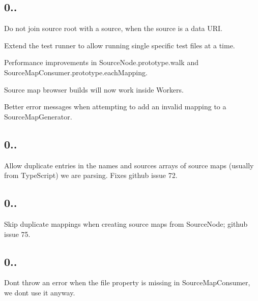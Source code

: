 \subsection*{0..}


\begin{DoxyItemize}
\item Do not join source root with a source, when the source is a data U\+R\+I.
\item Extend the test runner to allow running single specific test files at a time.
\item Performance improvements in {\ttfamily Source\+Node.\+prototype.\+walk} and {\ttfamily Source\+Map\+Consumer.\+prototype.\+each\+Mapping}.
\item Source map browser builds will now work inside Workers.
\item Better error messages when attempting to add an invalid mapping to a {\ttfamily Source\+Map\+Generator}.
\end{DoxyItemize}

\subsection*{0..}


\begin{DoxyItemize}
\item Allow duplicate entries in the {\ttfamily names} and {\ttfamily sources} arrays of source maps (usually from Type\+Script) we are parsing. Fixes github issue 72.
\end{DoxyItemize}

\subsection*{0..}


\begin{DoxyItemize}
\item Skip duplicate mappings when creating source maps from Source\+Node; github issue 75.
\end{DoxyItemize}

\subsection*{0..}


\begin{DoxyItemize}
\item Don\textquotesingle{}t throw an error when the {\ttfamily file} property is missing in Source\+Map\+Consumer, we don\textquotesingle{}t use it anyway.
\end{DoxyItemize}


